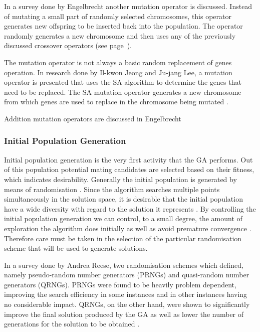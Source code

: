 In a survey done by Engelbrecht\cite{CompuIntelligenceIntro} another mutation operator is discussed. Instead of mutating a small part of randomly selected chromosomes, this operator generates new offspring to be inserted back into the population. The operator randomly generates a new chromosome and then uses any of the previously discussed crossover operators (see page~\pageref{sec:crossover}).

The mutation operator is not always a basic random replacement of genes operation. In research done by Il-kwon Jeong and Ju-jang Lee\cite{AdaptiveSAGA}, a mutation operator is presented that uses the SA algorithm to determine the genes that need to be replaced. The SA mutation operator generates a new chromosome from which genes are used to replace in the chromosome being mutated \cite{AdaptiveSAGA}.

Addition mutation operators are discussed in Engelbrecht\cite{CompuIntelligenceIntro}
\subsubsection{Initial Population Generation}
Initial population generation is the very first activity that the GA performs. Out of this population potential mating candidates are selected based on their fitness, which indicates desirability. Generally the initial population is generated by means of randomisation \cite{SelfAdaptiveGA}. Since the algorithm searches multiple points simultaneously in the solution space, it is desirable that the initial population have a wide diversity with regard to the solution it represents \cite{CombinedBranchBoundGA,DistributedHierarchicalGA}. By controlling the initial population generation we can control, to a small degree, the amount of exploration the algorithm does initially as well as avoid premature convergence \cite{CombinedBranchBoundGA}. Therefore care must be taken in the selection of the particular randomisation scheme that will be used to generate solutions.

In a survey done by Andrea Reese\cite{RandomNumberGA}, two randomisation schemes which defined, namely pseudo-random number generators (PRNGs) and quasi-random number generators (QRNGs). PRNGs were found to be heavily problem dependent, improving the search efficiency in some instances and in other instances having no considerable impact. QRNGs, on the other hand, were shown to significantly improve the final solution produced by the GA as well as lower the number of generations for the solution to be obtained \cite{RandomNumberGA}.

